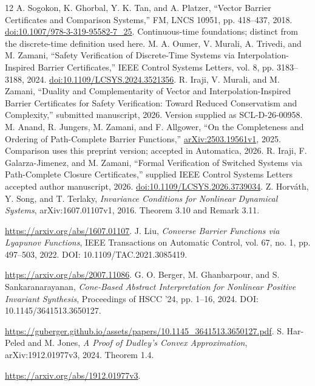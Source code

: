 \documentclass[journal,10pt]{IEEEtran}
\theoremstyle{definition}\newtheorem{definition}{Definition}
\theoremstyle{remark}
\begin{document}
\begin{thebibliography}{12}
 A. Sogokon, K. Ghorbal, Y. K. Tan, and A. Platzer, ``Vector Barrier Certificates and Comparison Systems,'' FM, LNCS 10951, pp. 418--437, 2018. \href{https://doi.org/10.1007/978-3-319-95582-7_25}{doi:10.1007/978-3-319-95582-7\_25}. Continuous-time foundations; distinct from the discrete-time definition used here.
 M. A. Oumer, V. Murali, A. Trivedi, and M. Zamani, ``Safety Verification of Discrete-Time Systems via Interpolation-Inspired Barrier Certificates,'' IEEE Control Systems Letters, vol. 8, pp. 3183--3188, 2024. \href{https://doi.org/10.1109/LCSYS.2024.3521356}{doi:10.1109/LCSYS.2024.3521356}.
 R. Iraji, V. Murali, and M. Zamani, ``Duality and Complementarity of Vector and Interpolation-Inspired Barrier Certificates for Safety Verification: Toward Reduced Conservatism and Complexity,'' submitted manuscript, 2026. Version supplied as SCL-D-26-00958.
 M. Anand, R. Jungers, M. Zamani, and F. Allgower, ``On the Completeness and Ordering of Path-Complete Barrier Functions,'' \href{https://arxiv.org/abs/2503.19561}{arXiv:2503.19561v1}, 2025. Comparison uses this preprint version; accepted in Automatica, 2026.
 R. Iraji, F. Galarza-Jimenez, and M. Zamani, ``Formal Verification of Switched Systems via Path-Complete Closure Certificates,'' supplied IEEE Control Systems Letters accepted author manuscript, 2026. \href{https://doi.org/10.1109/LCSYS.2026.3739034}{doi:10.1109/LCSYS.2026.3739034}.
 Z. Horv\'ath, Y. Song, and T. Terlaky,
\emph{Invariance Conditions for Nonlinear Dynamical Systems},
arXiv:1607.01107v1, 2016. Theorem 3.10 and Remark 3.11.
\par\url{https://arxiv.org/abs/1607.01107}.
 J. Liu, \emph{Converse Barrier Functions via Lyapunov Functions},
IEEE Transactions on Automatic Control, vol. 67, no. 1, pp. 497--503, 2022.
DOI: 10.1109/TAC.2021.3085419.
\par\url{https://arxiv.org/abs/2007.11086}.
 G. O. Berger, M. Ghanbarpour, and S. Sankaranarayanan,
\emph{Cone-Based Abstract Interpretation for Nonlinear Positive Invariant Synthesis},
Proceedings of HSCC '24, pp. 1--16, 2024.
DOI: 10.1145/3641513.3650127.
\par\url{https://guberger.github.io/assets/papers/10.1145_3641513.3650127.pdf}.
 S. Har-Peled and M. Jones,
\emph{A Proof of Dudley's Convex Approximation},
arXiv:1912.01977v3, 2024. Theorem 1.4.
\par\url{https://arxiv.org/abs/1912.01977v3}.

\end{thebibliography}
\end{document}
